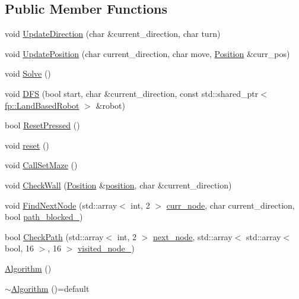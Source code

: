 \subsection*{Public Member Functions}
\begin{DoxyCompactItemize}
\item 
void \hyperlink{classfp_1_1_algorithm_ab91291b423ce58ba86e317112ca0c5ba}{Update\+Direction} (char \&current\+\_\+direction, char turn)
\item 
void \hyperlink{classfp_1_1_algorithm_a31c6fa52ea1a75e1a9b3179cb018b6ef}{Update\+Position} (char current\+\_\+direction, char move, \hyperlink{structfp_1_1_algorithm_1_1_position}{Position} \&curr\+\_\+pos)
\item 
void \hyperlink{classfp_1_1_algorithm_ac6e4cae1f140d0155f2feaaaf1d287c1}{Solve} ()
\item 
void \hyperlink{classfp_1_1_algorithm_a5883d1cbb2d20803903de4bb0873f359}{D\+FS} (bool start, char \&current\+\_\+direction, const std\+::shared\+\_\+ptr$<$ \hyperlink{classfp_1_1_land_based_robot}{fp\+::\+Land\+Based\+Robot} $>$ \&robot)
\item 
bool \hyperlink{classfp_1_1_algorithm_a169e9e4e400a85687aa6554a3cbd2e04}{Reset\+Pressed} ()
\item 
void \hyperlink{classfp_1_1_algorithm_a182de09af3489ef37ea0fd4a4baeacbc}{reset} ()
\item 
void \hyperlink{classfp_1_1_algorithm_a434cfecd6898f4e89ba632433fa19afd}{Call\+Set\+Maze} ()
\item 
void \hyperlink{classfp_1_1_algorithm_aecb33f136eb5c2cb6130f9b26a4320b0}{Check\+Wall} (\hyperlink{structfp_1_1_algorithm_1_1_position}{Position} \&\hyperlink{classfp_1_1_algorithm_a841339b57c3d2739325f3f421ada43b6}{position}, char \&current\+\_\+direction)
\item 
void \hyperlink{classfp_1_1_algorithm_ab12d9f15d25fe35e3e7733570c626413}{Find\+Next\+Node} (std\+::array$<$ int, 2 $>$ \hyperlink{classfp_1_1_algorithm_a88395e8c0b52c4aef33b41caff21300c}{curr\+\_\+node}, char current\+\_\+direction, bool \hyperlink{classfp_1_1_algorithm_a7a37ba8431c685c42f305a73812efecb}{path\+\_\+blocked\+\_\+})
\item 
bool \hyperlink{classfp_1_1_algorithm_a9270347a0ca5be0f7717e6772de5f87c}{Check\+Path} (std\+::array$<$ int, 2 $>$ \hyperlink{classfp_1_1_algorithm_ac3672498d86469ee445fe66a140952cb}{next\+\_\+node}, std\+::array$<$ std\+::array$<$ bool, 16 $>$, 16 $>$ \hyperlink{classfp_1_1_algorithm_a41904cf962dd8c46901d39ab03d77545}{visited\+\_\+node\+\_\+})
\item 
\hyperlink{classfp_1_1_algorithm_adaa1af41614b0d95c2a940cc87c68a2e}{Algorithm} ()
\item 
\hyperlink{classfp_1_1_algorithm_aefb8012b9e6457191d7fc16affe5a700}{$\sim$\+Algorithm} ()=default
\end{DoxyCompactItemize}

